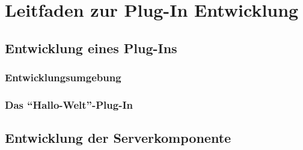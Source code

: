\chapter{Leitfaden zur Plug-In Entwicklung}
\label{cha:leitfaden}

\section{Entwicklung eines Plug-Ins}
\subsection{Entwicklungsumgebung}
\subsection{Das ``Hallo-Welt''-Plug-In}

\section{Entwicklung der Serverkomponente}